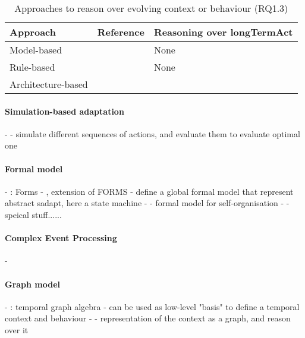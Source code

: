 \begin{table}
	\begin{center}
    	\begin{tabular}{p{}p{}p{}}
    		\hline
    		\textbf{Approach} & \textbf{Reference} & Reasoning over \gls{longTermAct}\\
    		\hline
    		Model-based & \cite{DBLP:journals/computer/BlairBF09, DBLP:journals/computer/MorinBJFS09, DBLP:conf/seke/0001FNMKT14, DBLP:conf/models/0001FNMKBT14, DBLP:conf/icse/BarbosaLMJ17, DBLP:conf/icse/ChenPYNZ14} & None\\
    		Rule-based & \cite{DBLP:conf/icse/ArcainiRS15, DBLP:conf/icse/TaharaOH17, DBLP:conf/eurosys/GraceHPBCT08} & None \\
    		Architecture-based & \cite{DBLP:journals/jss/ChengG12, DBLP:journals/computer/GarlanCHSS04, DBLP:journals/computer/GeorgasHT09, DBLP:conf/cbse/FouquetMFBPJ12} & \\
    		\hline
    	\end{tabular}
    	\caption{Approaches to reason over evolving context or \gls{behaviour} (RQ1.3)}
    	\label{table:sota:results:actions:rq1.3}
    \end{center}
\end{table}

\paragraph{Simulation-based adaptation}
- \cite{DBLP:conf/smartgridsec/0001FKNT14}
	- simulate different sequences of actions, and evaluate them to evaluate optimal one

\paragraph{Formal model}
- \cite{DBLP:journals/taas/WeynsMA12}: Forms
- \cite{DBLP:conf/icse/IftikharW14a}, extension of FORMS
	- define a global formal model that represent abstract \gls{sadapt}, here a state machine
- \cite{DBLP:journals/taas/WeynsHH10}
	- formal model for self-organisation
- \cite{DBLP:conf/icse/BartelsK11}
	- speical stuff......

\paragraph{Complex Event Processing}
- \cite{DBLP:conf/rr/AnicicFRSSS10}

\paragraph{Graph model}
- \cite{DBLP:conf/dbpl/MoffittS17}: temporal graph algebra
	- can be used as low-level "basis" to define a temporal context and behaviour
- \cite{DBLP:journals/tse/KramerM90}
	- representation of the context as a graph, and reason over it
	
